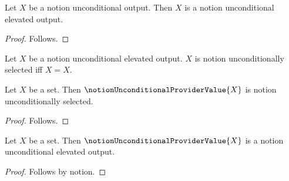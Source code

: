 \begin{classification}\label{notion_unconditional_output_is_elevated}
    Let $X$ be a notion unconditional output.
    Then $X$ is a notion unconditional elevated output.
\end{classification}
\begin{proof}
    Follows.
\end{proof}

\begin{definition}\label{notion_unconditional_selected}
    Let $X$ be a notion unconditional elevated output.
    $X$ is notion unconditionally selected iff $X=X$.
\end{definition}

\begin{proposition}\label{notion_unconditional_provider_same_module}
    Let $X$ be a set.
    Then $\notionUnconditionalProviderValue{X}$ is notion unconditionally selected.
\end{proposition}
\begin{proof}
    Follows.
\end{proof}

\begin{proposition}\label{notion_unconditional_provider_by_notion}
    Let $X$ be a set.
    Then $\notionUnconditionalProviderValue{X}$ is a notion unconditional elevated output.
\end{proposition}
\begin{proof}
    Follows by notion.
\end{proof}
